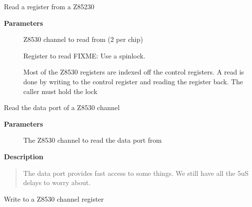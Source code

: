 \documentclass[a4paper,8pt,english]{sphinxmanual}
\begin{document}
\begin{fulllineitems}
\label{networking/z8530book:c.read_zsreg}
Read a register from a Z85230

\end{fulllineitems}


\textbf{Parameters}
\begin{description}
\item[{}] \leavevmode
Z8530 channel to read from (2 per chip)

\item[{}] \leavevmode
Register to read
FIXME: Use a spinlock.

Most of the Z8530 registers are indexed off the control registers.
A read is done by writing to the control register and reading the
register back.  The caller must hold the lock

\end{description}

\begin{fulllineitems}
\label{networking/z8530book:c.read_zsdata}
Read the data port of a Z8530 channel

\end{fulllineitems}


\textbf{Parameters}
\begin{description}
\item[{}] \leavevmode
The Z8530 channel to read the data port from

\end{description}

\textbf{Description}
\begin{quote}

The data port provides fast access to some things. We still
have all the 5uS delays to worry about.
\end{quote}

\begin{fulllineitems}
\label{networking/z8530book:c.write_zsreg}
Write to a Z8530 channel register

\end{fulllineitems}
\end{document}
